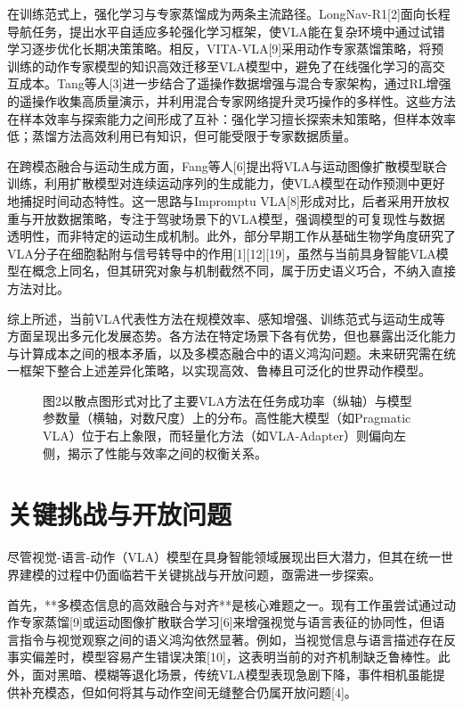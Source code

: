 \documentclass{article}
\begin{document}
在训练范式上，强化学习与专家蒸馏成为两条主流路径。LongNav-R1[2]面向长程导航任务，提出水平自适应多轮强化学习框架，使VLA能在复杂环境中通过试错学习逐步优化长期决策策略。相反，VITA-VLA[9]采用动作专家蒸馏策略，将预训练的动作专家模型的知识高效迁移至VLA模型中，避免了在线强化学习的高交互成本。Tang等人[3]进一步结合了遥操作数据增强与混合专家架构，通过RL增强的遥操作收集高质量演示，并利用混合专家网络提升灵巧操作的多样性。这些方法在样本效率与探索能力之间形成了互补：强化学习擅长探索未知策略，但样本效率低；蒸馏方法高效利用已有知识，但可能受限于专家数据质量。

在跨模态融合与运动生成方面，Fang等人[6]提出将VLA与运动图像扩散模型联合训练，利用扩散模型对连续运动序列的生成能力，使VLA模型在动作预测中更好地捕捉时间动态特性。这一思路与Impromptu VLA[8]形成对比，后者采用开放权重与开放数据策略，专注于驾驶场景下的VLA模型，强调模型的可复现性与数据透明性，而非特定的运动生成机制。此外，部分早期工作从基础生物学角度研究了VLA分子在细胞黏附与信号转导中的作用[1][12][19]，虽然与当前具身智能VLA模型在概念上同名，但其研究对象与机制截然不同，属于历史语义巧合，不纳入直接方法对比。

综上所述，当前VLA代表性方法在规模效率、感知增强、训练范式与运动生成等方面呈现出多元化发展态势。各方法在特定场景下各有优势，但也暴露出泛化能力与计算成本之间的根本矛盾，以及多模态融合中的语义鸿沟问题。未来研究需在统一框架下整合上述差异化策略，以实现高效、鲁棒且可泛化的世界动作模型。

\begin{figure}[h]
\centering
\caption{图2以散点图形式对比了主要VLA方法在任务成功率（纵轴）与模型参数量（横轴，对数尺度）上的分布。高性能大模型（如Pragmatic VLA）位于右上象限，而轻量化方法（如VLA-Adapter）则偏向左侧，揭示了性能与效率之间的权衡关系。}
\label{fig:1}
\end{figure}

\section{关键挑战与开放问题}

尽管视觉-语言-动作（VLA）模型在具身智能领域展现出巨大潜力，但其在统一世界建模的过程中仍面临若干关键挑战与开放问题，亟需进一步探索。

首先，**多模态信息的高效融合与对齐**是核心难题之一。现有工作虽尝试通过动作专家蒸馏[9]或运动图像扩散联合学习[6]来增强视觉与语言表征的协同性，但语言指令与视觉观察之间的语义鸿沟依然显著。例如，当视觉信息与语言描述存在反事实偏差时，模型容易产生错误决策[10]，这表明当前的对齐机制缺乏鲁棒性。此外，面对黑暗、模糊等退化场景，传统VLA模型表现急剧下降，事件相机虽能提供补充模态，但如何将其与动作空间无缝整合仍属开放问题[4]。
\end{document}
